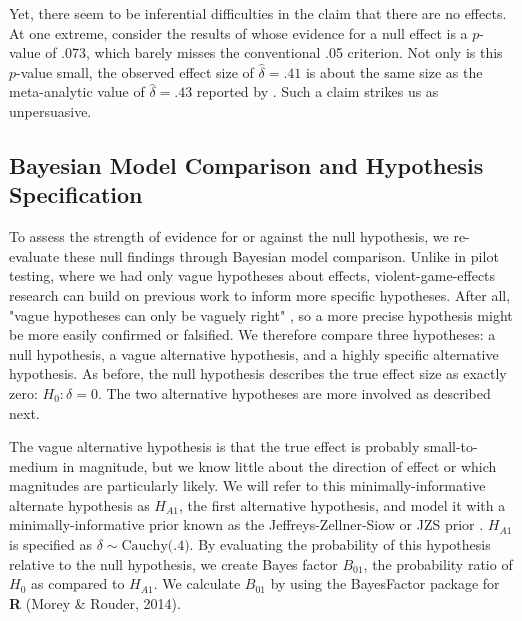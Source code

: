 \documentclass[man]{apa6}
\begin{document}
Yet, there seem to be inferential difficulties in the claim that there are no effects.  At one extreme, consider the results of \citet{Elson:etal:2013} whose evidence for a null effect is a $p$-value of .073, which barely misses the conventional .05 criterion.  Not only is this $p$-value small, the observed effect size of $\hat{\delta}=.41$ is about the same size as the meta-analytic value of $\hat{\delta}=.43$ reported by \citet{Anderson:etal:2010}.  Such a claim strikes us as unpersuasive.

\subsection{Bayesian Model Comparison and Hypothesis Specification}
To assess the strength of evidence for or against the null hypothesis, we re-evaluate these null findings through Bayesian model comparison. Unlike in pilot testing, where we had only vague hypotheses about effects, violent-game-effects research can build on previous work to inform more specific hypotheses. After all, "vague hypotheses can only be vaguely right" \citep[p. 4]{Gallistel:2009}, so a more precise hypothesis might be more easily confirmed or falsified. We therefore compare three hypotheses: a null hypothesis, a vague alternative hypothesis, and a highly specific alternative hypothesis. As before, the null hypothesis describes the true effect size as exactly zero: $H_0: \delta = 0$. The two alternative hypotheses are more involved as described next. 

The vague alternative hypothesis is that the true effect is probably small-to-medium in magnitude, but we know little about the direction of effect or which magnitudes are particularly likely. We will refer to this minimally-informative alternate hypothesis as $H_{A1}$, the first alternative hypothesis, and model it with a minimally-informative prior known as the Jeffreys-Zellner-Siow or JZS prior \citep[see ][]{Rouder:etal:2009a}.
$H_{A1}$ is specified as $\delta \sim \mbox{Cauchy(.4)}$. By evaluating the probability of this hypothesis relative to the null hypothesis, we create Bayes factor $B_{01}$, the probability ratio of $H_0$ as compared to $H_{A1}$. We calculate $B_{01}$ by using the BayesFactor package for \textbf{R} (Morey \& Rouder, 2014).
\end{document}
